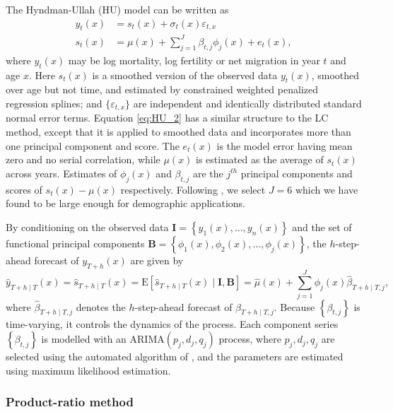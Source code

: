 \documentclass[
  doublespace]{anzsauth}
\begin{document}
The Hyndman-Ullah (HU) model can be written as
\begin{align}
  y_t(x) & = s_t(x) + \sigma_t(x)\varepsilon_{t,x}\label{eq:HU_1}\\
  s_t(x) & = \mu(x) + \sum_{j=1}^{J}\beta_{t,j}\phi_j(x) + e_t(x)\label{eq:HU_2},
\end{align}
where \(y_t(x)\) may be log mortality, log fertility or net migration \citep{HB08} in year \(t\) and age \(x\). Here \(s_t(x)\) is a smoothed version of the observed data \(y_t(x)\), smoothed over age but not time, and estimated by constrained weighted penalized regression splines; and \(\{\varepsilon_{t,x}\}\) are independent and identically distributed standard normal error terms. Equation \eqref{eq:HU_2} has a similar structure to the LC method, except that it is applied to smoothed data and incorporates more than one principal component and score. The \(e_t(x)\) is the model error having mean zero and no serial correlation, while \(\mu(x)\) is estimated as the average of \(s_t(x)\) across years. Estimates of \(\phi_j(x)\) and \(\beta_{t,j}\) are the \(j^{th}\) principal components and scores of \(s_t(x)-\mu(x)\) respectively. Following \citet{HB08}, we select \(J=6\) which we have found to be large enough for demographic applications.

By conditioning on the observed data \(\bm{I}=\left\{{y_1(x),\dots,y_n(x)}\right\}\) and the set of functional principal components \(\bm{B}=\left\{{\phi_1(x),\phi_2(x),\dots,\phi_j(x)}\right\}\), the \(h\)-step-ahead forecast of \(y_{T+h}(x)\) are given by
\begin{equation}
  \widehat{y}_{T+h\mid T}(x)=\widehat{s}_{T+h\mid T}(x) = \text{E}[\widehat{s}_{T+h\mid T}(x)\mid \bm{I, B}] = \widehat{\mu}(x)+\sum_{j=1}^{J}\phi_j(x)\widehat{\beta}_{T+h\mid T,j},
\end{equation}
where \(\widehat{\beta}_{T+h\mid T,j}\) denotes the \(h\)-step-ahead forecast of \(\beta_{T+h\mid T,j}\). Because \(\left\{\beta_{t,j}\right\}\) is time-varying, it controls the dynamics of the process. Each component series \(\left\{\beta_{t,j}\right\}\) is modelled with an ARIMA\((p_j,d_j,q_j)\) process, where \(p_j,d_j,q_j\) are selected using the automated algorithm of \citet{forecastpackage}, and the parameters are estimated using maximum likelihood estimation.

\hypertarget{product-ratio-method}{%
\subsubsection*{Product-ratio method}\label{product-ratio-method}}
\end{document}
